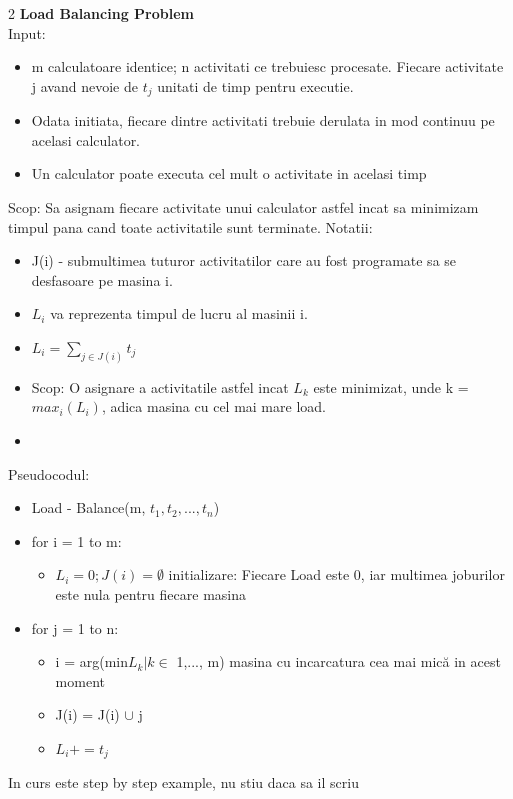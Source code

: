 \documentclass[a4paper]{article}
\begin{document}
\begin{multicols}{2}
\textbf{Load Balancing Problem} \\
Input:
\begin{itemize}
    \item m calculatoare identice; n activitati ce trebuiesc procesate. Fiecare activitate j avand nevoie de $t_j$ unitati de timp pentru executie.
    \item Odata initiata, fiecare dintre activitati trebuie derulata in mod continuu pe acelasi calculator.
    \item Un calculator poate executa cel mult o activitate in acelasi timp
\end{itemize}
Scop: Sa asignam fiecare activitate unui calculator astfel incat sa minimizam timpul pana cand toate activitatile sunt terminate.
Notatii:
\begin{itemize}
    \item J(i) - submultimea tuturor activitatilor care au fost programate sa se desfasoare pe masina i.
    \item $L_i$ va reprezenta timpul de lucru al masinii i.
    \item $L_i = \sum_{j \in J(i)} t_j$
    \item Scop: O asignare a activitatile astfel incat $L_k$ este minimizat, unde k = $max_i(L_i)$, adica masina cu cel mai mare load.
    \item 
\end{itemize}
Pseudocodul:
\begin{itemize}[{}]
    \item Load - Balance(m, $t_1, t_2, ..., t_n$)
    \item for i = 1 to m:
    \begin{itemize}[{}]
        \item $L_i = 0; J(i) = \emptyset $  initializare: Fiecare Load este 0, iar multimea joburilor este nula pentru fiecare masina
    \end{itemize}
    \item for j = 1 to n:
    \begin{itemize}[{}]
        \item i = arg(min{$L_k | k \in$ {1,..., m}})  masina cu incarcatura cea mai mică in acest moment
        \item J(i) = J(i) $\cup$ {j}
        \item $L_i += t_j$ 
    \end{itemize}
\end{itemize}

In curs este step by step example, nu stiu daca sa il scriu \\


\end{multicols}
\end{document}
